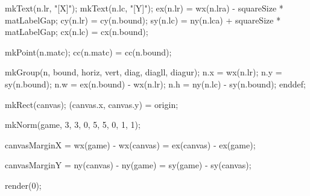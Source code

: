   mkText(n.lr, "[X]");
  mkText(n.lc, "[Y]");
  ex(n.lr) = wx(n.lra) - squareSize * matLabelGap;
  cy(n.lr) = cy(n.bound);
  sy(n.lc) = ny(n.lca) + squareSize * matLabelGap;
  cx(n.lc) = cx(n.bound);

  mkPoint(n.matc);
  cc(n.matc) = cc(n.bound);

  mkGroup(n, bound, horiz, vert, diag, diagll, diagur);
  n.x = wx(n.lr);
  n.y = sy(n.bound);
  n.w = ex(n.bound) - wx(n.lr);
  n.h = ny(n.lc) - sy(n.bound);
enddef;


mkRect(canvas);
(canvas.x, canvas.y) = origin;

mkNorm(game, 3, 3, 0, 5, 5, 0, 1, 1);

canvasMarginX =
wx(game) - wx(canvas) =
ex(canvas) - ex(game);

canvasMarginY =
ny(canvas) - ny(game) =
sy(game) - sy(canvas);

\stopMPinitializations

\startMPpage
  render(0);
\stopMPpage
